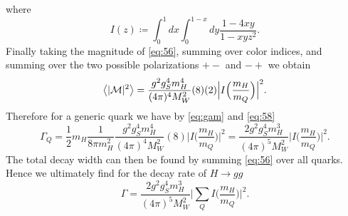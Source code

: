 where
\begin{equation}
  I(z)\coloneqq\int_0^1dx\int_0^{1-x}dy\frac{1-4xy}{1-xyz^2}.
\end{equation}
Finally taking the magnitude of \eqref{eq:56}, summing over color indices,
and summing over the two possible polarizations $+-$ and $-+$ we obtain
\begin{equation}
  \label{eq:58}
  \big<|\ME|^2\big>=\frac{g^2g_S^4m_H^4}{(4\pi)^4M_W^2}(8)(2)
      \Big|I\Big(\frac{m_H}{m_Q}\Big)\Big|^2.
\end{equation}
Therefore for a generic quark we have by \eqref{eq:gam} and \eqref{eq:58}
\begin{equation}
  \label{eq:59}
  \Gamma_Q=\frac{1}{2}m_H\frac{1}{8\pi m_H^2}
            \frac{g^2 g_S^4m_H^4}{(4\pi)^4 M_W^2}(8)
            \Big|I\Big(\frac{m_H}{m_Q}\Big)\Big|^2
          =\frac{2g^2 g_S^4m_H^3}{(4\pi)^5 M_W^2}
            \Big|I\Big(\frac{m_H}{m_Q}\Big)\Big|^2.
\end{equation}
The total decay width can then be found by summing \eqref{eq:56} over all
quarks. Hence we ultimately find for the decay rate of $H\to gg$
\begin{equation}
  \Gamma=\frac{2g^2 g_S^4m_H^3}{(4\pi)^5 M_W^2}
          \Big|\sum\limits_Q I\Big(\frac{m_H}{m_Q}\Big)\Big|^2.
\end{equation}





